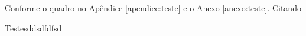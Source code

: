 \documentclass[
    12pt, %
    oneside,
    a4paper,
    english,
    brazil
]{report}
\begin{document}
\onehalfspacing
\justify

\setlength\parindent{1.25cm} %
\setlength{\parskip}{1.241pt} %


\tableofcontents

\begingroup
  
\endgroup

\begingroup
      

  Conforme o quadro no Apêndice \ref{apendice:teste} e o Anexo \ref{anexo:teste}. Citando \textcite{brasil-lei-11.892-2008}
  
  Testesddsdfdfsd

\endgroup

\begin{SecoesNaoNumeradas}
\begingroup
  \begin{FlushLeft} %
    \printbibliography[heading=bibintoc, title=Referências]
  \end{FlushLeft}
\endgroup

\begingroup
\let\clearpage\relax
{}\label{apendice:teste}
\lipsum[6-7]
\endgroup

\begingroup 
\let\clearpage\relax
{}\label{anexo:teste}
\lipsum[6-7]
\endgroup
\end{SecoesNaoNumeradas}
\end{document}
